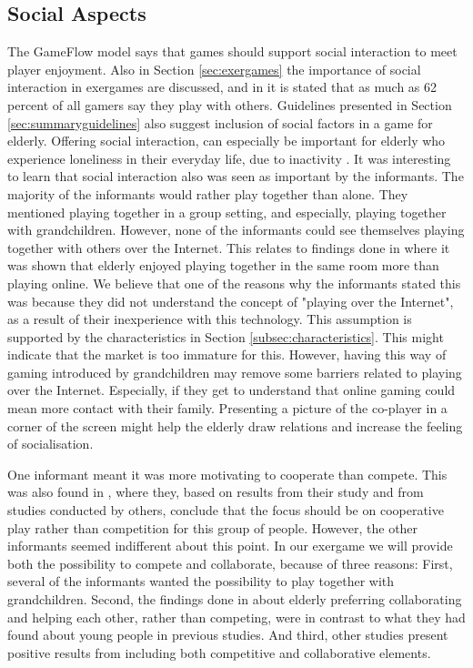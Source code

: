 \subsection{Social Aspects}
The GameFlow model says that games should support social interaction to meet player enjoyment. Also in Section \ref{sec:exergames} the importance of social interaction in exergames are discussed, and  in \cite{statistics2012} it is stated that as much as 62 percent of all gamers say they play with others. Guidelines presented in Section \ref{sec:summaryguidelines} also suggest inclusion of social factors in a game for elderly. Offering social interaction, can especially be important for elderly who experience loneliness in their everyday life, due to inactivity \cite{exergamesforelderly}. It was interesting to learn that social interaction also was seen as important by the informants. The majority of the informants would rather play together than alone. They mentioned playing together in a group setting, and especially, playing together with grandchildren. However, none of the informants could see themselves playing together with others over the Internet. This relates to findings done in \cite{Gajadhar} where it was shown that elderly enjoyed playing together in the same room more than playing online. We believe that one of the reasons why the informants stated this was because they did not understand the concept of "playing over the Internet", as a result of their inexperience with this technology. This assumption is supported by the characteristics in Section \ref{subsec:characteristics}. This might indicate that the market is too immature for this. However, having this way of gaming introduced by grandchildren may remove some barriers related to playing over the Internet. Especially, if they get to understand that online gaming could mean more contact with their family. Presenting a picture of the co-player in a corner of the screen might help the elderly draw relations and increase the feeling of socialisation.   

One informant meant it was more motivating to cooperate than compete. This was also found in \cite{Gajadhar}, where they, based on results from their study and from studies conducted by others, conclude that the focus should be on cooperative play rather than competition for this group of people. However, the other informants seemed indifferent about this point. In our exergame we will provide both the possibility to compete and collaborate, because of three reasons: First, several of the informants wanted the possibility to play together with grandchildren. Second, the findings done in \cite{Gajadhar} about elderly preferring collaborating and helping each other, rather than competing, were in contrast to what they had found about young people in previous studies. And third, other studies present positive results from including both competitive and collaborative elements. 

